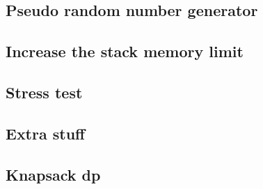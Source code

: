 \subsection{Pseudo random number generator}
\raggedbottom
\hrulefill
\subsection{Increase the stack memory limit}
\raggedbottom
\hrulefill
\subsection{Stress test}
\raggedbottom
\hrulefill

\subsection{Extra stuff}
\raggedbottom 
\hrulefill

\subsection{Knapsack dp}
\raggedbottom
\hrulefill
